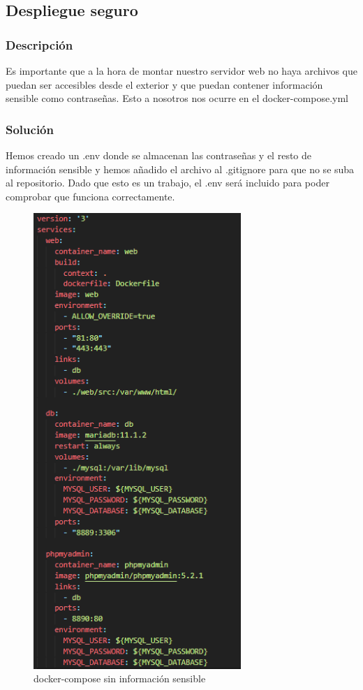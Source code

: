 \documentclass{report}
\begin{document}
            \subsection{Despliegue seguro}
                \subsubsection{Descripción}
                    Es importante que a la hora de montar nuestro servidor web no haya archivos que puedan ser accesibles desde el exterior y que puedan contener información sensible como contraseñas. Esto a nosotros nos ocurre en el docker-compose.yml
                \subsubsection{Solución}
                    Hemos creado un .env donde se almacenan las contraseñas y el resto de información sensible y hemos añadido el archivo al .gitignore para que no se suba al repositorio.
                    Dado que esto es un trabajo, el .env será incluido para poder comprobar que funciona correctamente.
                    \begin{figure}[H]
                        \centering
                        \includegraphics[width=0.7\textwidth]{./img/vulnerabilidades/3.5/1.1.png}
                        \caption{docker-compose sin información sensible}
                    \end{figure}
            \clearpage
\end{document}
